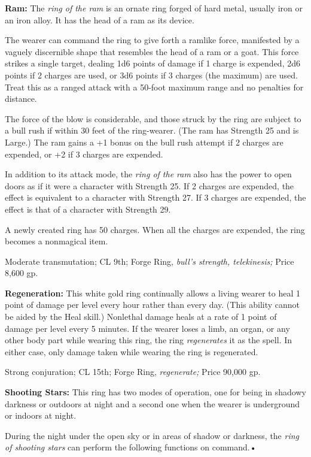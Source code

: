 \textbf{Ram:} The \textit{ring of the ram }is an ornate ring forged of hard metal, 
usually iron or an iron alloy. It has the head of a ram as its device.

The wearer can command the ring to give forth a ramlike force, manifested by a 
vaguely discernible shape that resembles the head of a ram or a goat. This force 
strikes a single target, dealing 1d6 points of damage if 1 charge is expended, 
2d6 points if 2 charges are used, or 3d6 points if 3 charges (the maximum) are 
used. Treat this as a ranged attack with a 50-foot maximum range and no penalties 
for distance. 

The force of the blow is considerable, and those struck by the ring are subject 
to a bull rush if within 30 feet of the ring-wearer. (The ram has Strength 25 and 
is Large.) The ram gains a +1 bonus on the bull rush attempt if 2 charges are expended, 
or +2 if 3 charges are expended.

In addition to its attack mode, the \textit{ring of the ram }also has the power 
to open doors as if it were a character with Strength 25. If 2 charges are expended, 
the effect is equivalent to a character with Strength 27. If 3 charges are expended, 
the effect is that of a character with Strength 29.

A newly created ring has 50 charges. When all the charges are expended, the ring 
becomes a nonmagical item.

Moderate transmutation; CL 9th; Forge Ring, \textit{bull's strength, telekinesis; 
}Price 8,600 gp.

\textbf{Regeneration:} This white gold ring continually allows a living wearer 
to heal 1 point of damage per level every hour rather than every day. (This ability 
cannot be aided by the Heal skill.) Nonlethal damage heals at a rate of 1 point 
of damage per level every 5 minutes. If the wearer loses a limb, an organ, or any 
other body part while wearing this ring, the ring \textit{regenerates }it as the 
spell. In either case, only damage taken while wearing the ring is regenerated.

Strong conjuration; CL 15th; Forge Ring, \textit{regenerate; }Price 90,000 gp.

\textbf{Shooting Stars:} This ring has two modes of operation, one for being in 
shadowy darkness or outdoors at night and a second one when the wearer is underground 
or indoors at night.

During the night under the open sky or in areas of shadow or darkness, the \textit{ring 
of shooting stars }can perform the following functions on command.•

